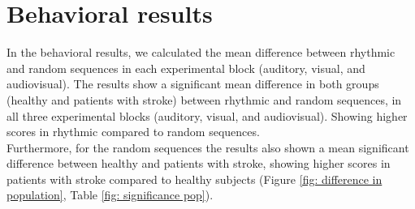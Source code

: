 \clearpage
\section{Behavioral results}
In the behavioral results, we calculated the mean difference between rhythmic and random sequences in each experimental block (auditory, visual, and audiovisual). The results show a significant mean difference in both groups (healthy and patients with stroke) between rhythmic and random sequences, in all three experimental blocks (auditory, visual, and audiovisual). Showing higher scores in rhythmic compared to random sequences. \\ %
Furthermore, for the random sequences the results also shown a mean significant difference between healthy and patients with stroke, showing higher scores in patients with stroke compared to healthy subjects (Figure \ref{fig: difference in population}, Table \ref{fig: significance pop}). 
